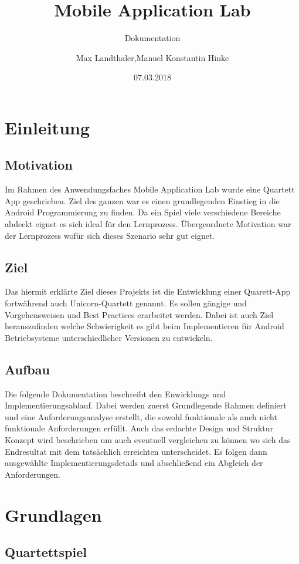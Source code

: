 \documentclass{scrartcl}
\title{Mobile Application Lab}
\subtitle{Dokumentation}
\date{07.03.2018}
\author{Max Landthaler,Manuel Konstantin Hinke}
\begin{document}
\maketitle

\section{Einleitung}
\subsection{Motivation}


Im Rahmen des Anwendungsfaches Mobile Application Lab wurde eine Quartett App geschrieben. Ziel des ganzen war es einen grundlegenden Einstieg in die Android Programmierung zu finden. Da ein Spiel viele verschiedene Bereiche abdeckt eignet es sich ideal für den Lernprozess.
Übergeordnete Motivation war der Lernprozess wofür sich dieses Szenario sehr gut eignet.

\subsection{Ziel}

Das hiermit erklärte Ziel dieses Projekts ist die Entwicklung einer Quarett-App fortwährend auch Unicorn-Quartett genannt. Es sollen gängige und Vorgehensweisen und Best Practices erarbeitet werden.
Dabei ist auch Ziel herauszufinden welche Schwierigkeit es gibt beim Implementieren für Android Betriebsysteme unterschiedlicher Versionen zu entwickeln.


\subsection{Aufbau}

Die folgende Dokumentation beschreibt den Enwicklungs und Implementierungsablauf.
Dabei werden zuerst Grundlegende Rahmen definiert und eine Anforderungsanalyse erstellt, die sowohl funktionale als auch nicht funktionale Anforderungen erfüllt.
Auch das erdachte Design und Struktur Konzept wird beschrieben um auch eventuell vergleichen zu können wo sich das Endresultat mit dem tatsächlich erreichten unterscheidet.
Es folgen dann ausgewählte Implementierungsdetails und abschließend ein Abgleich der Anforderungen.

\section{Grundlagen}
\subsection{Quartettspiel}
\end{document}
